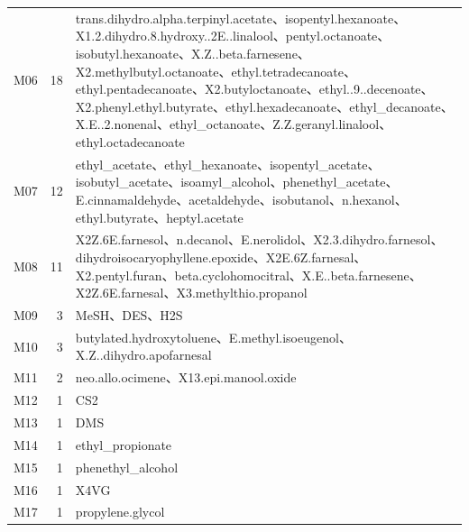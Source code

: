 \begin{longtable}{@{}l r p{}@{}}
M06 & 18 & trans.\allowbreak{}dihydro.\allowbreak{}alpha.\allowbreak{}terpinyl.\allowbreak{}acetate、isopentyl.\allowbreak{}hexanoate、X1.\allowbreak{}2.\allowbreak{}dihydro.\allowbreak{}8.\allowbreak{}hydroxy.\allowbreak{}.\allowbreak{}2E.\allowbreak{}.\allowbreak{}linalool、pentyl.\allowbreak{}octanoate、isobutyl.\allowbreak{}hexanoate、X.\allowbreak{}Z.\allowbreak{}.\allowbreak{}beta.\allowbreak{}farnesene、X2.\allowbreak{}methylbutyl.\allowbreak{}octanoate、ethyl.\allowbreak{}tetradecanoate、ethyl.\allowbreak{}pentadecanoate、X2.\allowbreak{}butyloctanoate、ethyl.\allowbreak{}.\allowbreak{}9.\allowbreak{}.\allowbreak{}decenoate、X2.\allowbreak{}phenyl.\allowbreak{}ethyl.\allowbreak{}butyrate、ethyl.\allowbreak{}hexadecanoate、ethyl\_decanoate、X.\allowbreak{}E.\allowbreak{}.\allowbreak{}2.\allowbreak{}nonenal、ethyl\_octanoate、Z.\allowbreak{}Z.\allowbreak{}geranyl.\allowbreak{}linalool、ethyl.\allowbreak{}octadecanoate \\
M07 & 12 & ethyl\_acetate、ethyl\_hexanoate、isopentyl\_acetate、isobutyl\_acetate、isoamyl\_alcohol、phenethyl\_acetate、E.\allowbreak{}cinnamaldehyde、acetaldehyde、isobutanol、n.\allowbreak{}hexanol、ethyl.\allowbreak{}butyrate、heptyl.\allowbreak{}acetate \\
M08 & 11 & X2Z.\allowbreak{}6E.\allowbreak{}farnesol、n.\allowbreak{}decanol、E.\allowbreak{}nerolidol、X2.\allowbreak{}3.\allowbreak{}dihydro.\allowbreak{}farnesol、dihydroisocaryophyllene.\allowbreak{}epoxide、X2E.\allowbreak{}6Z.\allowbreak{}farnesal、X2.\allowbreak{}pentyl.\allowbreak{}furan、beta.\allowbreak{}cyclohomocitral、X.\allowbreak{}E.\allowbreak{}.\allowbreak{}beta.\allowbreak{}farnesene、X2Z.\allowbreak{}6E.\allowbreak{}farnesal、X3.\allowbreak{}methylthio.\allowbreak{}propanol \\
M09 & 3 & MeSH、DES、H2S \\
M10 & 3 & butylated.\allowbreak{}hydroxytoluene、E.\allowbreak{}methyl.\allowbreak{}isoeugenol、X.\allowbreak{}Z.\allowbreak{}.\allowbreak{}dihydro.\allowbreak{}apofarnesal \\
M11 & 2 & neo.\allowbreak{}allo.\allowbreak{}ocimene、X13.\allowbreak{}epi.\allowbreak{}manool.\allowbreak{}oxide \\
M12 & 1 & CS2 \\
M13 & 1 & DMS \\
M14 & 1 & ethyl\_propionate \\
M15 & 1 & phenethyl\_alcohol \\
M16 & 1 & X4VG \\
M17 & 1 & propylene.\allowbreak{}glycol \\

\end{longtable}
